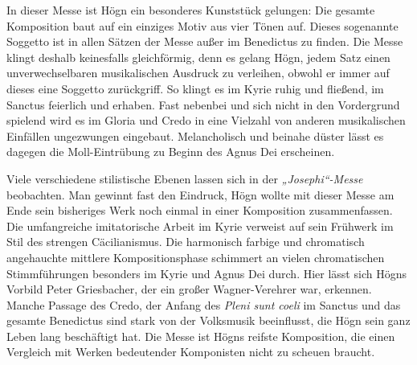 In dieser Messe ist Högn ein besonderes Kunststück gelungen: Die
gesamte Komposition baut auf ein einziges Motiv aus vier Tönen auf.
Dieses sogenannte Soggetto ist in allen Sätzen der Messe außer im
Benedictus zu finden. Die Messe klingt deshalb keinesfalls
gleichförmig, denn es gelang Högn, jedem Satz einen unverwechselbaren
musikalischen Ausdruck zu verleihen, obwohl er immer auf dieses eine
Soggetto zurückgriff. So klingt es im Kyrie ruhig und fließend, im
Sanctus feierlich und erhaben. Fast nebenbei und sich nicht in den
Vordergrund spielend wird es im Gloria und Credo in eine Vielzahl von
anderen musikalischen Einfällen ungezwungen eingebaut. Melancholisch
und beinahe düster lässt es dagegen die Moll-Eintrübung zu Beginn des
Agnus Dei erscheinen.

Viele verschiedene stilistische Ebenen lassen sich in der
\textit{„Josephi“-Messe} beobachten. Man gewinnt fast den Eindruck,
Högn wollte mit dieser Messe am Ende sein bisheriges Werk noch einmal
in einer Komposition zusammenfassen. Die umfangreiche imitatorische
Arbeit im Kyrie verweist auf sein Frühwerk im Stil des strengen
Cäcilianismus. Die harmonisch farbige und chromatisch angehauchte
mittlere Kompositionsphase schimmert an vielen chromatischen
Stimmführungen besonders im Kyrie und Agnus Dei durch. Hier lässt sich
Högns Vorbild Peter Griesbacher, der ein großer Wagner-Verehrer war,
erkennen. Manche Passage des Credo, der Anfang des \textit{Pleni sunt
coeli} im Sanctus und das gesamte Benedictus sind stark von der
Volksmusik beeinflusst, die Högn sein ganz Leben lang beschäftigt
hat. Die Messe ist Högns reifste Komposition, die einen Vergleich mit
Werken bedeutender Komponisten nicht zu scheuen braucht.